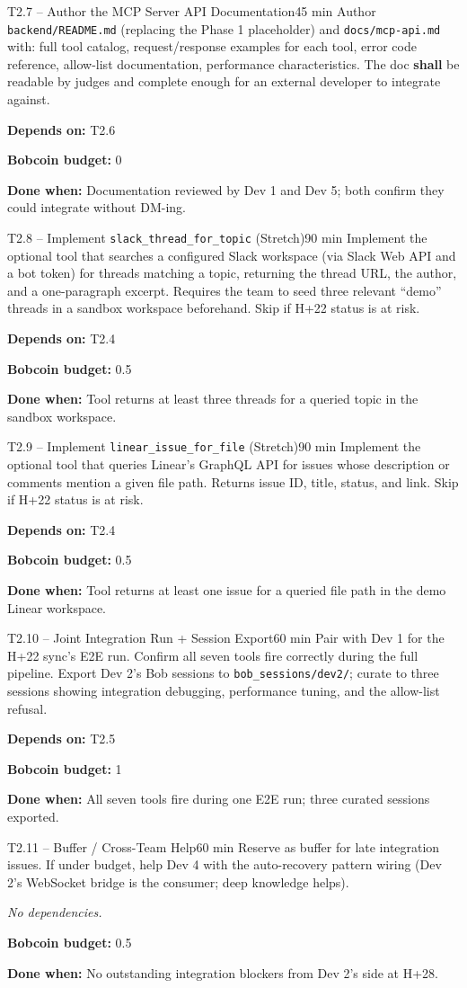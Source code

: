 \documentclass[11pt,letterpaper]{article}
\newcommand{\acceptance}[1]{\par\smallskip\textcolor{ibmgreen}{\textbf{Done when:}} #1}
\newcommand{\depends}[1]{\par\smallskip\textcolor{ibmorange}{\textbf{Depends on:}} #1}
\newcommand{\nodep}{\par\smallskip\textcolor{ibmgray}{\textit{No dependencies.}}}
\newcommand{\bobcost}[1]{\par\smallskip\textcolor{ibmaccent}{\textbf{Bobcoin budget:}} #1}
\newcommand{\shall}{\textbf{shall}}
\begin{document}
\begin{task}{T2.7 -- Author the MCP Server API Documentation}{45 min}
Author \texttt{backend/README.md} (replacing the Phase 1 placeholder) and \texttt{docs/mcp-api.md} with: full tool catalog, request/response examples for each tool, error code reference, allow-list documentation, performance characteristics. The doc \shall{} be readable by judges and complete enough for an external developer to integrate against.
\depends{T2.6}
\bobcost{0}
\acceptance{Documentation reviewed by Dev 1 and Dev 5; both confirm they could integrate without DM-ing.}
\end{task}

\begin{stretchtask}{T2.8 -- Implement \texttt{slack\_thread\_for\_topic} (Stretch)}{90 min}
Implement the optional tool that searches a configured Slack workspace (via Slack Web API and a bot token) for threads matching a topic, returning the thread URL, the author, and a one-paragraph excerpt. Requires the team to seed three relevant ``demo'' threads in a sandbox workspace beforehand. Skip if H+22 status is at risk.
\depends{T2.4}
\bobcost{0.5}
\acceptance{Tool returns at least three threads for a queried topic in the sandbox workspace.}
\end{stretchtask}

\begin{stretchtask}{T2.9 -- Implement \texttt{linear\_issue\_for\_file} (Stretch)}{90 min}
Implement the optional tool that queries Linear's GraphQL API for issues whose description or comments mention a given file path. Returns issue ID, title, status, and link. Skip if H+22 status is at risk.
\depends{T2.4}
\bobcost{0.5}
\acceptance{Tool returns at least one issue for a queried file path in the demo Linear workspace.}
\end{stretchtask}

\begin{task}{T2.10 -- Joint Integration Run + Session Export}{60 min}
Pair with Dev 1 for the H+22 sync's E2E run. Confirm all seven tools fire correctly during the full pipeline. Export Dev 2's Bob sessions to \texttt{bob\_sessions/dev2/}; curate to three sessions showing integration debugging, performance tuning, and the allow-list refusal.
\depends{T2.5}
\bobcost{1}
\acceptance{All seven tools fire during one E2E run; three curated sessions exported.}
\end{task}

\begin{task}{T2.11 -- Buffer / Cross-Team Help}{60 min}
Reserve as buffer for late integration issues. If under budget, help Dev 4 with the auto-recovery pattern wiring (Dev 2's WebSocket bridge is the consumer; deep knowledge helps).
\nodep
\bobcost{0.5}
\acceptance{No outstanding integration blockers from Dev 2's side at H+28.}
\end{task}
\end{document}
